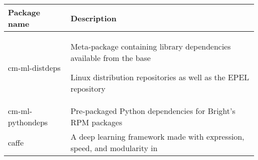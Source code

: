 \documentclass[]{article}
\begin{document}
\begin{longtable}[]{@{}ll@{}}

\toprule

\begin{minipage}[b]{0.17\columnwidth}\raggedright\strut

Package name\strut

\end{minipage} & \begin{minipage}[b]{0.18\columnwidth}\raggedright\strut

Description\strut

\end{minipage}\tabularnewline

\midrule

\endhead

\begin{minipage}[t]{0.17\columnwidth}\raggedright\strut

cm-ml-distdeps\strut

\end{minipage} & \begin{minipage}[t]{0.18\columnwidth}\raggedright\strut

Meta-package containing library dependencies available from the base

Linux distribution repositories as well as the EPEL repository\strut

\end{minipage}\tabularnewline

\begin{minipage}[t]{0.17\columnwidth}\raggedright\strut

cm-ml-pythondeps\strut

\end{minipage} & \begin{minipage}[t]{0.18\columnwidth}\raggedright\strut

Pre-packaged Python dependencies for Bright's RPM packages\strut

\end{minipage}\tabularnewline

\begin{minipage}[t]{0.17\columnwidth}\raggedright\strut

caffe\strut

\end{minipage} & \begin{minipage}[t]{0.18\columnwidth}\raggedright\strut

A deep learning framework made with expression, speed, and modularity in


\end{minipage}
\end{longtable}
\end{document}
